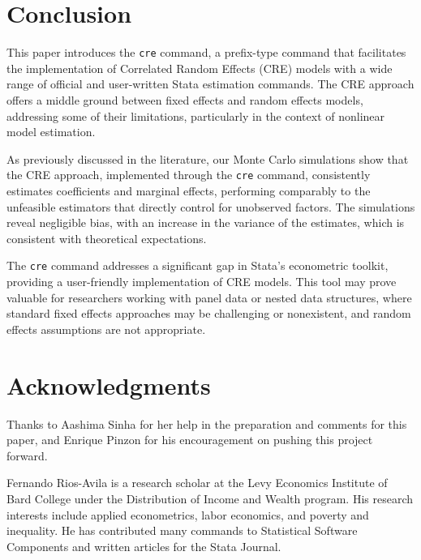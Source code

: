 \documentclass[bib]{statapress}
\begin{document}
\section{Conclusion}\label{sec-5}

This paper introduces the \texttt{cre} command, a prefix-type command
that facilitates the implementation of Correlated Random Effects (CRE)
models with a wide range of official and user-written Stata estimation
commands. The CRE approach offers a middle ground between fixed effects
and random effects models, addressing some of their limitations,
particularly in the context of nonlinear model estimation.

As previously discussed in the literature, our Monte Carlo simulations
show that the CRE approach, implemented through the \texttt{cre}
command, consistently estimates coefficients and marginal effects,
performing comparably to the unfeasible estimators that directly control
for unobserved factors. The simulations reveal negligible bias, with an
increase in the variance of the estimates, which is consistent with
theoretical expectations.

The \texttt{cre} command addresses a significant gap in Stata's
econometric toolkit, providing a user-friendly implementation of CRE
models. This tool may prove valuable for researchers working with panel
data or nested data structures, where standard fixed effects approaches
may be challenging or nonexistent, and random effects assumptions are
not appropriate.

\section{Acknowledgments}\label{acknowledgments}

Thanks to Aashima Sinha for her help in the preparation and comments for
this paper, and Enrique Pinzon for his encouragement on pushing this
project forward.

\clearpage





\begin{aboutauthors}

Fernando Rios-Avila is a research scholar at the Levy Economics
Institute of Bard College under the Distribution of Income and Wealth
program. His research interests include applied econometrics, labor
economics, and poverty and inequality. He has contributed many commands
to Statistical Software Components and written articles for the Stata
Journal.

\end{aboutauthors}
\end{document}
